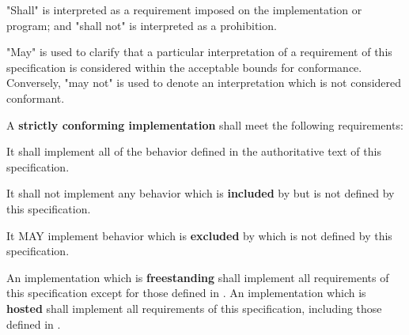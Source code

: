 
\specitem
"Shall" is interpreted as a requirement imposed on the implementation or
program; and "shall not" is interpreted as a prohibition.

\specitem
"May" is used to clarify that a particular interpretation of a requirement of
this specification is considered within the acceptable bounds for conformance.
Conversely, "may not" is used to denote an interpretation which is not
considered conformant.

\specitem
A \textbf{strictly conforming implementation} shall meet the following
requirements:

\specsubitem
It shall implement all of the behavior defined in the authoritative text of this
\\ specification.

\specsubitem
It shall not implement any behavior which is \textbf{included} by
 but is not defined by this specification.


\specsubitem
It MAY implement behavior which is \textbf{excluded} by 
which is not defined by this specification.

\specitem
An implementation which is \textbf{freestanding} shall implement all
requirements of this specification except for those defined in . An implementation which is \textbf{hosted} shall implement all
requirements of this specification, including those defined in
.

